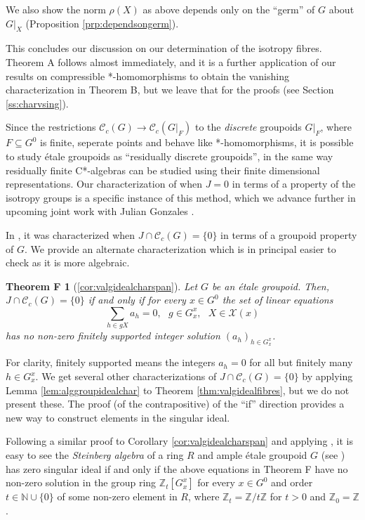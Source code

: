 \documentclass[a4paper, 12pt]{amsart}
\newtheorem*{thmF}{Theorem F}
\theoremstyle{definition}
\theoremstyle{remark}
\numberwithin{equation}{section}
\begin{document}
We also show the norm $\rho(X)$ as above depends only on the ``germ'' of $G$ about $G|_{X}$ (Proposition \ref{prp:dependsongerm}).

This concludes our discussion on our determination of the isotropy fibres. Theorem A follows almost immediately, and it is a further application of our results on compressible *-homomorphisms to obtain the vanishing characterization in Theorem B, but we leave that for the proofs (see Section \ref{ss:charvsing}).

Since the restrictions $\mathscr{C}_{c}(G)\to \mathscr{C}_{c}(G|_{F})$ to the \emph{discrete} groupoids $G|_{F}$,  where $F\subseteq G^{0}$ is finite, seperate points and behave like *-homomorphisms, it is possible to study \'etale groupoids as ``residually discrete groupoids'', in the same way residually finite C*-algebras can be studied using their finite dimensional representations. Our characterization of when $J=0$ in terms of a property of the isotropy groups is a specific instance of this method, which we advance further in upcoming joint work with Julian Gonzales \cite{GH25}.

In \cite[Theorem~4.2]{BGHL25}, it was characterized when $J\cap\mathscr{C}_{c}(G) = \{0\}$ in terms of a groupoid property of $G$. We provide an alternate characterization which is in principal easier to check as it is more algebraic.

\begin{thmF}[\ref{cor:valgidealcharspan}]
    Let $G$ be an \'etale groupoid. Then, $J\cap\mathscr{C}_{c}(G) = \{0\}$ if and only if for every $x\in G^{0}$ the set of linear equations
    $$\sum_{h\in gX}a_{h} = 0,\text{ }g\in G^{x}_{x},\text{ }X\in\mathcal{X}(x)$$
    has no non-zero finitely supported integer solution $(a_{h})_{h\in G^{x}_{x}}$.
\end{thmF}

For clarity, finitely supported means the integers $a_{h} = 0$ for all but finitely many $h\in G^{x}_{x}$. We get several other characterizations of $J\cap\mathscr{C}_{c}(G) = \{0\}$ by applying Lemma \ref{lem:alggroupidealchar} to Theorem \ref{thm:valgidealfibres}, but we do not present these. The proof (of the contrapositive) of the ``if'' direction provides a new way to construct elements in the singular ideal.

Following a similar proof to Corollary \ref{cor:valgidealcharspan} and applying \cite[Theorem~4.2]{BGHL25}, it is easy to see the \emph{Steinberg algebra} of a ring $R$ and ample \'etale groupoid $G$ (see \cite{SS20}) has zero singular ideal if and only if the above equations in Theorem F have no non-zero solution in the group ring $\mathbb{Z}_{t}[G^{x}_{x}]$ for every $x\in G^{0}$ and order $t\in\mathbb{N}\cup\{0\}$ of some non-zero element in $R$, where $\mathbb{Z}_{t} = \mathbb{Z}/t\mathbb{Z}$ for $t > 0$ and $\mathbb{Z}_{0} = \mathbb{Z}$.
\end{document}
